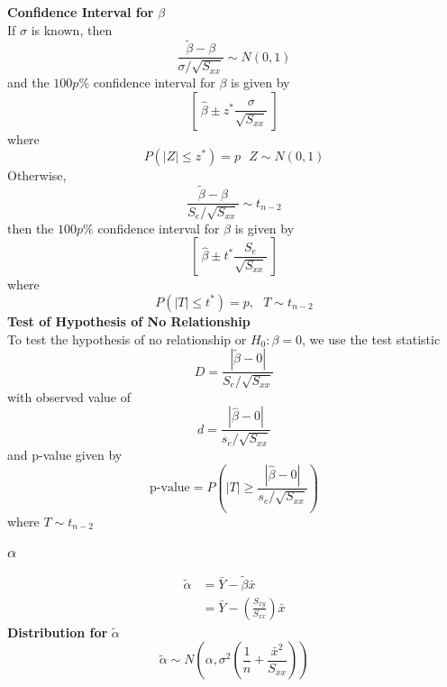 \documentclass[12pt]{article}
\theoremstyle{definition}
\begin{document}
  \textbf{Confidence Interval for} $\beta$ \\
  If $\sigma$ is known, then
  $$\frac{\widetilde{\beta} - \beta}{\sigma / \sqrt{S_{xx}}} \sim N(0, 1)$$
  and the $100p\%$ confidence interval for $\beta$ is given by
  $$\left[~ \hat{\beta} \pm z^{*}\frac{\sigma}{\sqrt{S_{xx}}} ~\right]$$
  where
  $$P(|Z| \leq z^{*}) = p ~~~ Z \sim N(0, 1)$$
  \newline
  Otherwise,
  $$\frac{\widetilde{\beta} - \beta}{S_{e} / \sqrt{S_{xx}}} \sim t_{n-2}$$
  then the $100p\%$ confidence interval for $\beta$ is given by
  $$\left[~ \hat{\beta} \pm t^{*}\frac{S_{e}}{\sqrt{S_{xx}}} ~\right]$$
  where
  $$P(|T| \leq t^{*}) = p, ~~~ T \sim t_{n-2}$$
  \newline
  \textbf{Test of Hypothesis of No Relationship} \\
  To test the hypothesis of no relationship or $H_{0}: \beta = 0$, we use the test statistic
  $$D = \frac{|\widetilde{\beta} - 0|}{S_{e} / \sqrt{S_{xx}}}$$
  with observed value of
  $$d = \frac{|\hat{\beta} - 0|}{s_{e} / \sqrt{S_{xx}}}$$
  and p-value given by
  $$\text{p-value} = P\left(|T| \geq \frac{|\hat{\beta} - 0|}{s_{e} / \sqrt{S_{xx}}}\right)$$
  where $T \sim t_{n-2}$

  \subsubsection{$\alpha$}
  \begin{align*}
  \widetilde{\alpha} &= \bar{Y} - \widetilde{\beta}\bar{x} \\
  &= \bar{Y} - \left(\frac{S_{xy}}{S_{xx}}\right)\bar{x}
  \end{align*}
  \textbf{Distribution for } $\widetilde{\alpha}$ \\
  $$\widetilde{\alpha} \sim N\left(\alpha, \sigma^{2}\left(\frac{1}{n} + \frac{\bar{x}^{2}}{S_{xx}}\right)\right)$$
\end{document}
